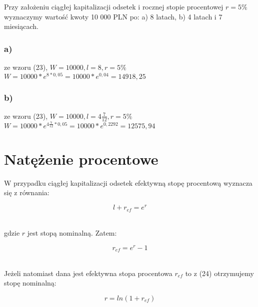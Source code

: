 \documentclass{article}
\begin{document}
Przy założeniu ciągłej kapitalizacji odsetek i rocznej stopie procentowej $ r = 5 \% $ wyznaczymy wartość kwoty 10 000 PLN po: a) 8 latach, b) 4 latach i 7 miesiącach.

\subsubsection{a)}

ze wzoru (23), $ W = 10 000, l = 8, r = 5 \% $\\

$ W = 10 000 * e^{8*0,05} = 10 000 * e^{0,04} = 14 918,25 $

\subsubsection{b)}

ze wzoru (23), $ W = 10 000, l = 4\frac{7}{12}, r = 5 \% $\\

$ W = 10 000 * e^{4\frac{7}{12}*0,05} = 10 000 * e^{0,2292} = 12 575,94 $

\newpage

%
%

\section{Natężenie procentowe}

W przypadku ciągłej kapitalizacji odsetek efektywną stopę procentową wyznacza się z równania:

\begin{center}
	\begin{equation}
		l + r_{ef} = e^r
	\end{equation}
\end{center}\\

gdzie $ r $ jest stopą nominalną. Zatem:

\begin{center}
	\begin{equation}
		r_{ef} = e^r - 1
	\end{equation}
\end{center}\\

Jeżeli natomiast dana jest efektywna stopa procentowa $ r_{ef} $ to z (24) otrzymujemy stopę nominalną:

\begin{center}
	\begin{equation}
		r = ln(1 + r_{ef})
	\end{equation}
\end{center}\\
\end{document}
